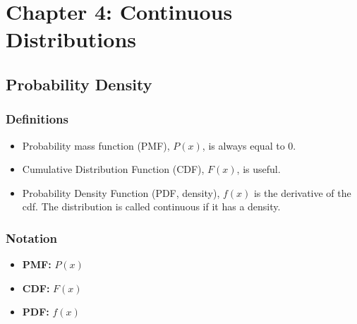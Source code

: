 \section{Chapter 4: Continuous Distributions}


\begin{multicols}{2}
\setlength{\columnsep}{1.5cm}
\setlength{\columnseprule}{0.2pt}

\subsection{Probability Density}

\subsubsection{Definitions}
\begin{itemize}
  \item Probability mass function (PMF), $P(x)$, is always equal to 0.
  \item Cumulative Distribution Function (CDF), $F(x)$, is useful.
  \item Probability Density Function (PDF, density), $f(x)$ is the derivative of the cdf. The distribution is called continuous if it has a density.
\end{itemize}

\subsubsection{Notation}
\begin{itemize}
  \item \textbf{PMF:} $P(x)$
  \item \textbf{CDF:} $F(x)$
  \item \textbf{PDF:} $f(x)$
\end{itemize}

\vfill\null
\columnbreak


\end{multicols}
